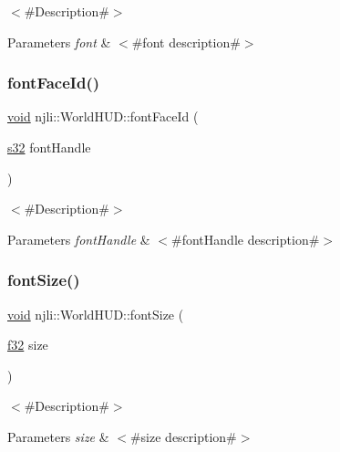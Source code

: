 $<$\#\+Description\#$>$


\begin{DoxyParams}{Parameters}
{\em font} & $<$\#font description\#$>$ \\
\hline
\end{DoxyParams}
\mbox{\label{classnjli_1_1_world_h_u_d_aa6e14180c1643291e14b129eee1a6be3}} 
\subsubsection{\texorpdfstring{font\+Face\+Id()}{fontFaceId()}}
{\footnotesize\ttfamily \mbox{\hyperlink{_thread_8h_af1e856da2e658414cb2456cb6f7ebc66}{void}} njli\+::\+World\+H\+U\+D\+::font\+Face\+Id (\begin{DoxyParamCaption}\item[{\mbox{\hyperlink{_util_8h_aa62c75d314a0d1f37f79c4b73b2292e2}{s32}}}]{font\+Handle }\end{DoxyParamCaption})}

$<$\#\+Description\#$>$


\begin{DoxyParams}{Parameters}
{\em font\+Handle} & $<$\#font\+Handle description\#$>$ \\
\hline
\end{DoxyParams}
\mbox{\label{classnjli_1_1_world_h_u_d_ac51e71d915cdf53232247d7786fa883c}} 
\subsubsection{\texorpdfstring{font\+Size()}{fontSize()}}
{\footnotesize\ttfamily \mbox{\hyperlink{_thread_8h_af1e856da2e658414cb2456cb6f7ebc66}{void}} njli\+::\+World\+H\+U\+D\+::font\+Size (\begin{DoxyParamCaption}\item[{\mbox{\hyperlink{_util_8h_a5f6906312a689f27d70e9d086649d3fd}{f32}}}]{size }\end{DoxyParamCaption})}

$<$\#\+Description\#$>$


\begin{DoxyParams}{Parameters}
{\em size} & $<$\#size description\#$>$ \\
\hline
\end{DoxyParams}
\mbox{\label{classnjli_1_1_world_h_u_d_abf86a4d4100ba69abb8426ff0d9fb06b}} 
